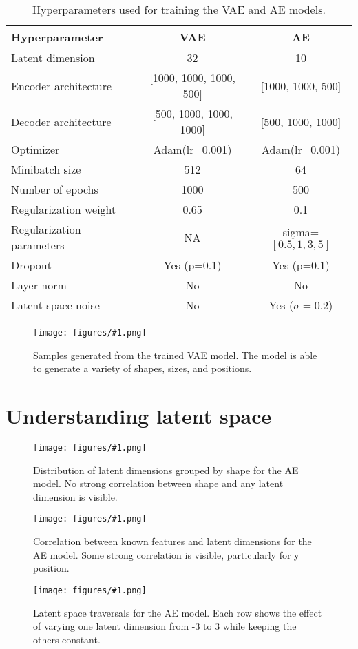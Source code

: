 \documentclass[conference,a4paper]{IEEEtran}
\newcommand{\centerfigure}[2]{
    \begin{figure}[htbp]
        \centering
        \texttt{[image: figures/\#1.png]}
        \caption{#2}
        \label{fig:#1}
    \end{figure}
}
\begin{document}
\begin{table}[htbp]
\caption{Hyperparameters used for training the VAE and AE models.}
\label{tab:hyperparams}
\centering
\begin{tabular}{l|c|c}
\toprule
\textbf{Hyperparameter} & \textbf{VAE} & \textbf{AE} \\
\midrule
Latent dimension & 32 & 10 \\
Encoder architecture & [1000, 1000, 1000, 500] & [1000, 1000, 500] \\
Decoder architecture & [500, 1000, 1000, 1000] & [500, 1000, 1000] \\
Optimizer & Adam(lr=0.001) & Adam(lr=0.001) \\
Minibatch size & 512 & 64 \\
Number of epochs & 1000 & 500 \\
Regularization weight & 0.65 & 0.1 \\
Regularization parameters & NA &  sigma=$[0.5,1,3,5]$\\
Dropout & Yes (p=0.1) & Yes (p=0.1) \\
Layer norm & No & No \\
Latent space noise & No & Yes ($\sigma=0.2$) \\
\bottomrule
\end{tabular}
\end{table}

\centerfigure{vae-generated}{Samples generated from the trained VAE model. The model is able to generate a variety of shapes, sizes, and positions.}

\section{Understanding latent space}

\centerfigure{ae-latent-by-shape}{Distribution of latent dimensions grouped by shape for the AE model. No strong correlation between shape and any latent dimension is visible.}

\centerfigure{ae-latent-corelation}{Correlation between known features and latent dimensions for the AE model. Some strong correlation is visible, particularly for y position.}

\centerfigure{ae-traversal-2}{Latent space traversals for the AE model. Each row shows the effect of varying one latent dimension from -3 to 3 while keeping the others constant.}
\end{document}

